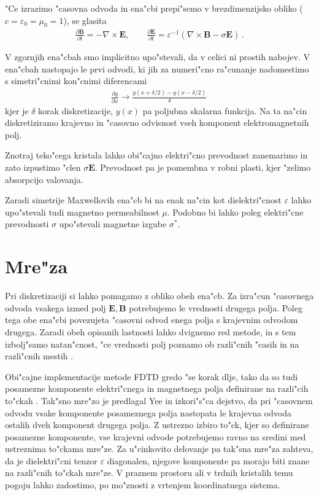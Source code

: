\documentclass[12pt,twoside,openright,final,a4paper]{report}
\newcommand{\odvod}[2]{\frac{\partial #1}{\partial #2}}
\renewcommand{\vec}{\mathbf}
\newcommand{\eps}{\varepsilon}
\begin{document}
"Ce izrazimo "casovna odvoda in ena"cbi prepi"semo v brezdimenzijsko obliko ($c = \varepsilon_0 = \mu_0 = 1$), se glasita
\begin{align}
\label{eq:maxwell-base}
 \odvod{\vec{B}}{t} = -\nabla \times \vec{E}, \qquad \odvod{\vec{E}}{t} = \eps^{-1} (\nabla \times \vec{B} - \sigma \vec E)\,.
\end{align}

V zgornjih ena"cbah smo implicitno upo"stevali, da v celici ni prostih nabojev.
V ena"cbah nastopajo le prvi odvodi, ki jih za numeri"cno ra"cunanje nadomestimo s simetri"cnimi kon"cnimi diferencami
\begin{align}
 \frac{\partial y}{\partial x} \rightarrow \frac{y(x+\delta/2) - y(x-\delta/2)}{\delta}\,
\end{align}
kjer je $\delta$ korak diskretizacije, $y(x)$ pa poljubna skalarna funkcija. 
Na ta na"cin diskretiziramo krajevno in "casovno odvisnost vseh komponent elektromagnetnih polj. 

Znotraj teko"cega kristala lahko obi"cajno elektri"cno prevodnost zanemarimo in zato izpustimo "clen $\sigma \vec E$. 
Prevodnost pa je pomembna v robni plasti, kjer "zelimo absorpcijo valovanja. 

Zaradi simetrije Maxwellovih ena"cb bi na enak na"cin kot dielektri"cnost $\varepsilon$ lahko upo"stevali tudi magnetno permeabilnost $\mu$. 
Podobno bi lahko poleg elektri"cne prevodnosti $\sigma$ upo"stevali magnetne izgube $\sigma^\ast$. 

\section{Mre"za}

Pri diskretizaciji si lahko pomagamo z obliko obeh ena"cb. 
Za izra"cun "casovnega odvoda vsakega izmed polj $\vec{E}, \vec{B}$ potrebujemo le vrednosti drugega polja. 
Poleg tega obe ena"cbi povezujeta "casovni odvod enega polja s krajevnim odvodom drugega. 
Zaradi obeh opisanih lastnosti lahko dvignemo red metode, in s tem izbolj"samo natan"cnost, "ce vrednosti polj poznamo ob razli"cnih "casih in na razli"cnih mestih \cite{taflove}. 

Obi"cajne implementacije metode \acs{FDTD} gredo "se korak dlje, tako da so tudi posamezne komponente elektri"cnega in magnetnega polja definirane na razli"cih to"ckah \cite{yee, yee-lattice}.
Tak"sno mre"zo je predlagal Yee in izkori"s"ca dejstvo, da pri "casovnem odvodu vsake komponente posameznega polja nastopata le krajevna odvoda ostalih dveh komponent drugega polja. 
Z ustrezno izbiro to"ck, kjer so definirane posamezne komponente, vse krajevni odvode potrebujemo ravno na sredini med ustreznima to"ckama mre"ze. 
Za u"cinkovito delovanje pa tak"sna mre"za zahteva, da je dielektri"cni tenzor $\eps$ diagonalen, njegove komponente pa morajo biti znane na razli"cnih to"ckah mre"ze. 
V praznem prostoru ali v trdnih kristalih temu pogoju lahko zadostimo, po mo"znosti z vrtenjem koordinatnega sistema.
\end{document}
